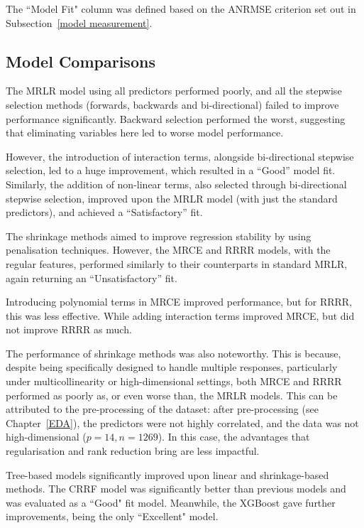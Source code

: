 \documentclass[11pt]{report} %
\begin{document}
\noindent The ``Model Fit" column was defined based on the ANRMSE criterion set out in Subsection~\ref{model measurement}. 

\subsection{Model Comparisons}
The MRLR model using all predictors performed poorly, and all the stepwise selection methods (forwards, backwards and bi-directional) failed to improve performance significantly. Backward selection performed the worst, suggesting that eliminating variables here led to worse model performance.

However, the introduction of interaction terms, alongside bi-directional stepwise selection, led to a huge improvement, which resulted in a ``Good” model fit. Similarly, the addition of non-linear terms, also selected through bi-directional stepwise selection, improved upon the MRLR model (with just the standard predictors), and achieved a ``Satisfactory” fit.

The shrinkage methods aimed to improve regression stability by using penalisation techniques. However, the MRCE and RRRR models,  with the regular features, performed similarly to their counterparts in standard MRLR, again returning an ``Unsatisfactory” fit. 

Introducing polynomial terms in MRCE improved performance, but for RRRR, this was less effective. While adding interaction terms improved MRCE, but did not improve RRRR as much.

The performance of shrinkage methods was also noteworthy. This is because, despite being specifically designed to handle multiple responses, particularly under multicollinearity or high-dimensional settings, both MRCE and RRRR performed as poorly as, or even worse than, the MRLR models. This can be attributed to the pre-processing of the dataset: after pre-processing (see Chapter~\ref{EDA}), the predictors were not highly correlated, and the data was not high-dimensional ($p = 14, n = 1269$). In this case, the advantages that regularisation and rank reduction bring are less impactful. 


Tree-based models significantly improved upon linear and shrinkage-based methods. The CRRF model was significantly better than previous models and was evaluated as a ``Good" fit model. Meanwhile, the XGBoost gave further improvements, being the only ``Excellent" model. 
\end{document}
